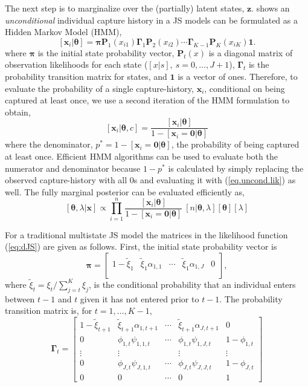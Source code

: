 \documentclass[11pt]{article}
\newcommand{\bx}{\ensuremath{\mathbf{x}}}
\newcommand{\bP}{\ensuremath{\mathbf{P}}}
\newcommand{\bz}{\ensuremath{\mathbf{z}}}
\newcommand{\bpi}{\ensuremath{\boldsymbol{\pi}}}
\newcommand{\bG}{\ensuremath{\boldsymbol{\Gamma}}}
\newcommand{\bt}{\ensuremath{\boldsymbol{\theta}}}
\begin{document}
The next step is to marginalize over the (partially) latent states, $\bz$. \cite{mcclintock2020uncovering} shows an \emph{unconditional} individual capture history in a JS models can be formulated as a Hidden Markov Model (HMM),
%
\begin{equation}
\label{eq.uncond.lik}
[\bx_i|\bt] = \bpi\bP_1(x_{i1})\bG_1\bP_2(x_{i2}) \cdots \bG_{K-1}\bP_K(x_{iK})\mathbf{1}.
\end{equation}
where $\bpi$ is the initial state probability vector, $\bP_t(x)$ is a diagonal matrix of observation likelihoods for each state ($[x|s],\ s=0,\dots,J+1$), $\bG_t$ is the probability transition matrix for states, and $\mathbf{1}$ is a vector of ones. Therefore, to evaluate the probability of a single capture-history, $\bx_i$, conditional on being captured at least once, we use a second iteration of the HMM formulation to obtain,
\begin{equation}
\label{eq:dJS}
 [\bx_i|\bt,c]  = \frac{[\bx_i|\bt]}{1-[\bx_i=\mathbf{0}|\bt]}
\end{equation}
where the denominator, $p^*=1-[\bx_i=\mathbf{0}|\bt]$, the probability of being captured at least once. Efficient HMM algorithms can be used to evaluate both the numerator and denominator because $1 - p^*$ is calculated by simply replacing the observed capture-history with all 0s and evaluating it with (\ref{eq.uncond.lik}) as well. The fully marginal posterior can be evaluated efficiently as,
\begin{equation}\label{eq.js.lik}
[\bt,\lambda|\bx] \propto \prod_{i=1}^n \frac{[\bx_i|\bt]}{1-[\bx_i=\mathbf{0}|\bt]}~ [n|\bt, \lambda][\bt][\lambda]
\end{equation}

For a traditional multistate JS model the matrices in the likelihood function (\ref{eq:dJS}) are given as follows. First, the initial state probability vector is 
%
\[
\bpi = \left[\begin{array}{cccccc} 
1-\tilde{\xi}_1 & \tilde{\xi}_1\alpha_{1,1} & \cdots & \tilde{\xi}_1\alpha_{1,J} & 0 \\
\end{array}\right],
\]
% 
 where $\tilde{\xi}_t = \xi_t /\sum_{j=t}^K \xi_j$, is the conditional probability that an individual enters between $t-1$ and $t$ given it has not entered prior to $t-1$. The probability transition matrix is, for $t=1,\dots,K-1$,
%
\begin{equation}
\label{eq.gamma.mat}
\bG_t = 
\left[\begin{array}{ccccccc}
1-\tilde{\xi}_{t+1} & \tilde{\xi}_{t+1}\alpha_{1,t+1} & \cdots & \tilde{\xi}_{t+1}\alpha_{J,t+1} & 0\\
0 & \phi_{1,t} \psi_{1,1,t} & \cdots & \phi_{1,t} \psi_{1,J,t} & 1-\phi_{1,t}\\
\vdots & \vdots & & \vdots & \vdots \\
0 & \phi_{J,t} \psi_{J,1,t} & \cdots & \phi_{J,t} \psi_{J,J,t} & 1-\phi_{J,t}\\
0 & 0 & \cdots & 0 & 1
\end{array} \right]
\end{equation}
\end{document}
